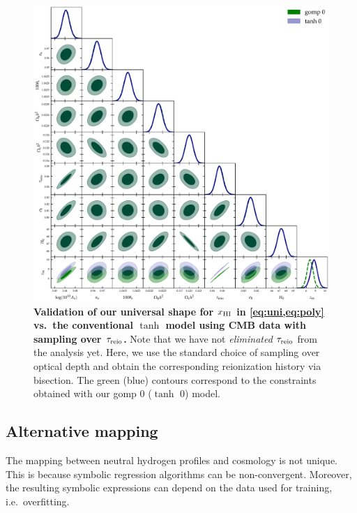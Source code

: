 \begin{figure}[t]
\centering
\includegraphics[width=\linewidth]{figs/gomp_tanh_triangle_tau.pdf}
\caption{\textbf{Validation of our universal shape for $x_{\mathrm{HI}}$ in \cref{eq:uni,eq:poly} vs.\ the
conventional $\tanh$ model using CMB data with sampling over $\tau_{\mathrm{reio}}$.}
Note that we have not \emph{eliminated} $\tau_{\mathrm{reio}}$ from the analysis
yet. Here, we use the standard choice of sampling
over optical depth and obtain the corresponding reionization history via bisection.
The green (blue) contours correspond to the constraints obtained with
our gomp 0 ($\tanh$ 0) model.}
\label{fig:tg}
\end{figure}


\subsection*{Alternative mapping}
\label{ssec:SRHalf}

The mapping between neutral hydrogen profiles and cosmology is not
unique.
This is because symbolic regression algorithms can be non-convergent.
Moreover, the resulting symbolic expressions can depend on the data used
for training, i.e.\ overfitting.

